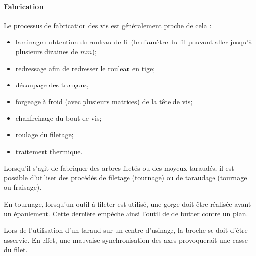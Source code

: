 \documentclass[11pt,oneside]{article}
\begin{document}
\paragraph*{Fabrication}
Le processus de fabrication des vis est généralement proche de cela : 
\begin{itemize}
\item laminage : obtention de rouleau de fil (le diamètre du fil pouvant aller jusqu'à plusieurs dizaines de $mm$);
\item redressage afin de redresser le rouleau en tige;
\item découpage des tronçons;
\item forgeage à froid (avec plusieurs matrices) de la tête de vis;
\item chanfreinage du bout de vis;
\item roulage du filetage;
\item traitement thermique.
\end{itemize}


Lorsqu'il s'agit de fabriquer des arbres filetés ou des moyeux taraudés, il est possible d'utiliser des procédés de filetage (tournage) ou de taraudage (tournage ou fraisage). 

En tournage, lorsqu'un outil à fileter est utilisé, une gorge doit être réalisée avant un épaulement. Cette dernière empêche ainsi l'outil de de butter contre un plan. 

Lors de l'utilisation d'un taraud sur un centre d'usinage, la broche se doit d'être asservie. En effet, une mauvaise synchronisation des axes provoquerait une casse du filet. 
\end{document}
